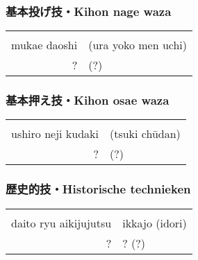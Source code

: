 \subsubsection{基本投げ技・Kihon nage waza}
\begin{table}[H]
\begin{center}
\begin{tabular}{rl}
    \ruby{}{}\ruby{}{} & \\
    mukae daoshi & (ura yoko men uchi)\\
    ? & (?)
\end{tabular}
\end{center}
\label{kyuu_5_kihon_nage_waza}
\end{table}

\subsubsection{基本押え技・Kihon osae waza}
\begin{table}[H]
\begin{center}
\begin{tabular}{rl}
    \ruby{}{}\ruby{}{} & \\
    ushiro neji kudaki & (tsuki ch\={u}dan)\\
    ? & (?)
\end{tabular}
\end{center}
\label{kyuu_5_kihon_osae_waza}
\end{table}

\subsubsection{歴史的技・Historische technieken}
\begin{table}[H]
\begin{center}
\begin{tabular}{rl}
    \ruby{}{}\ruby{}{} & \\
    daito ryu aikijujutsu & ikkajo (idori)\\
    ? & ? (?)
\end{tabular}
\end{center}
\label{kyuu_5_historic}
\end{table}
